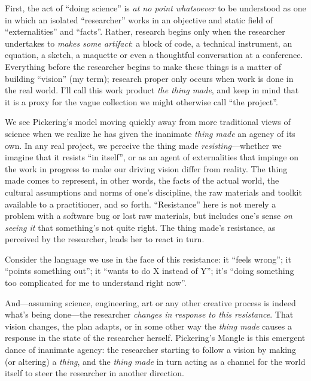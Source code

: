 First, the act of ``doing science'' is \emph{at no point whatsoever} to be understood as one in which an isolated ``researcher'' works in an objective and static field of ``externalities'' and ``facts''. Rather, research begins only when the researcher undertakes to \emph{makes some artifact}: a block of code, a technical instrument, an equation, a sketch, a maquette or even a thoughtful conversation at a conference. Everything before the researcher begins to make these things is a matter of building ``vision'' (my term); research proper only occurs when work is done in the real world. I'll call this work product \emph{the thing made}, and keep in mind that it is a proxy for the vague collection we might otherwise call ``the project''.

We see Pickering's model moving quickly away from more traditional views of science when we realize he has given the inanimate \emph{thing made} an agency of its own. In any real project, we perceive the thing made \emph{resisting}---whether we imagine that it resists ``in itself'', or as an agent of externalities that impinge on the work in progress to make our driving vision differ from reality. The thing made comes to represent, in other words, the facts of the actual world, the cultural assumptions and norms of one's discipline, the raw materials and toolkit available to a practitioner, and so forth. ``Resistance'' here is not merely a problem with a software bug or lost raw materials, but includes one's sense \emph{on seeing it} that something's not quite right. The thing made's resistance, as perceived by the researcher, leads her to react in turn.

Consider the language we use in the face of this resistance: it ``feels wrong''; it ``points something out''; it ``wants to do X instead of Y''; it's ``doing something too complicated for me to understand right now''.

And---assuming science, engineering, art or any other creative process is indeed what's being done---the researcher \emph{changes in response to this resistance}. That vision changes, the plan adapts, or in some other way the \emph{thing made} causes a response in the state of the researcher herself. Pickering's Mangle is this emergent dance of inanimate agency: the researcher starting to follow a vision by making (or altering) a \emph{thing}, and the \emph{thing made} in turn acting as a channel for the world itself to steer the researcher in another direction.

